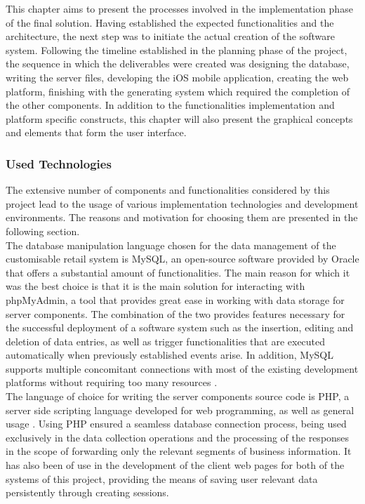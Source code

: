 This chapter aims to present the processes involved in the implementation phase of the final solution. Having established the expected functionalities and the architecture, the next step was to initiate the actual creation of the software system. Following the timeline established in the planning phase of the project, the sequence in which the deliverables were created was designing the database, writing the server files, developing the iOS mobile application, creating the web platform, finishing with the generating system which required the completion of the other components. In addition to the functionalities implementation and platform specific constructs, this chapter will also present the graphical concepts and elements that form the user interface.

\subsubsection{Used Technologies}

The extensive number of components and functionalities considered by this project lead to the usage of various implementation technologies and development environments. The reasons and motivation for choosing them are presented in the following section.\\

The database manipulation language chosen for the data management of the customisable retail system is MySQL, an open-source software provided by Oracle that offers a substantial amount of functionalities. The main reason for which it was the best choice is that it is the main solution for interacting with phpMyAdmin, a tool that provides great ease in working with data storage for server components. The combination of the two provides features necessary for the successful deployment of a software system such as the insertion, editing and deletion of data entries, as well as trigger functionalities that are executed automatically when previously established events arise. In addition, MySQL supports multiple concomitant connections with most of the existing development platforms without requiring too many resources \cite{schifreen_2010}.\\

The language of choice for writing the server components source code is PHP, a server side scripting language developed for web programming, as well as general usage \cite{runceanu_2014}. Using PHP ensured a seamless database connection process, being used exclusively in the data collection operations and the processing of the responses in the scope of forwarding only the relevant segments of business information. It has also been of use in the development of the client web pages for both of the systems of this project, providing the means of saving user relevant data persistently through creating sessions.\\

